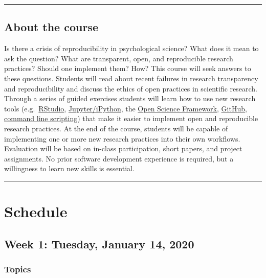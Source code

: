 \documentclass[
]{article}
\begin{document}
\begin{center}\rule{0.5\linewidth}{0.5pt}\end{center}

\hypertarget{about-the-course}{%
\subsection{About the course}\label{about-the-course}}

Is there a crisis of reproducibility in psychological science? What does
it mean to ask the question? What are transparent, open, and
reproducible research practices? Should one implement them? How? This
course will seek answers to these questions. Students will read about
recent failures in research transparency and reproducibility and discuss
the ethics of open practices in scientific research. Through a series of
guided exercises students will learn how to use new research tools
(e.g.~\href{https://www.rstudio.com}{RStudio},
\href{http://jupyter.org}{Jupyter/iPython}, the
\href{http://osf.io}{Open Science Framework},
\href{http://github.com}{GitHub},
\href{https://en.wikipedia.org/wiki/Command-line_interface}{command line
scripting}) that make it easier to implement open and reproducible
research practices. At the end of the course, students will be capable
of implementing one or more new research practices into their own
workflows. Evaluation will be based on in-class participation, short
papers, and project assignments. No prior software development
experience is required, but a willingness to learn new skills is
essential.

\begin{center}\rule{0.5\linewidth}{0.5pt}\end{center}

\hypertarget{schedule}{%
\section{Schedule}\label{schedule}}

\hypertarget{week-1-tuesday-january-14-2020}{%
\subsection{Week 1: Tuesday, January 14,
2020}\label{week-1-tuesday-january-14-2020}}

\hypertarget{topics}{%
\subsubsection{Topics}\label{topics}}
\end{document}
